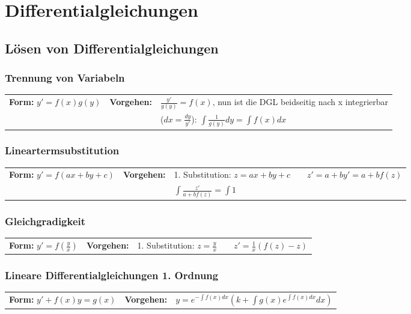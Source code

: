 \section{Differentialgleichungen }

\subsection{Lösen von Differentialgleichungen}

\subsubsection{Trennung von Variabeln }
\begin{tabular}{p{4cm}p{1.5cm}p{10.5cm}}
\textbf{Form:} $y' = f(x) g(y)$ &
\textbf{Vorgehen:}              &
$\frac{y'}{g(y)} = f(x)$, nun ist die DGL beidseitig nach x integrierbar\\  &&
($dx = \frac{dy}{y'}$): $\int \frac{1}{g(y)} dy = \int f(x) dx$ 
\end{tabular}

\subsubsection{Lineartermsubstitution }
\begin{tabular}{p{4cm}p{1.5cm}p{10.5cm}}
\textbf{Form:} $y'=f(ax+by+c)$   &
\textbf{Vorgehen:}               &
1. Substitution: $z=ax+by+c \qquad z'=a+by' =a+bf(z)$\\ &&
$\int\frac{z'}{a+bf(z)} = \int 1$
\end{tabular}

\subsubsection{Gleichgradigkeit}
\begin{tabular}{p{4cm}p{1.5cm}p{10.5cm}}
\textbf{Form:} $y'=f(\frac{y}{x})$ &
\textbf{Vorgehen:}                &
1. Substitution: $z=\frac{y}{x} \qquad
z'=\frac{1}{x}(f(z)-z)$
\end{tabular}

\subsubsection{Lineare Differentialgleichungen 1. Ordnung }
\begin{tabular}{p{4cm}p{1.5cm}p{10.5cm}}
\textbf{Form:} $ y'+f(x)y = g(x) $ &
\textbf{Vorgehen:}                 &
$ y=e^{-\int f(x) dx}(k+\int g(x)e^{\int f(x)dx}dx)$
\end{tabular}

